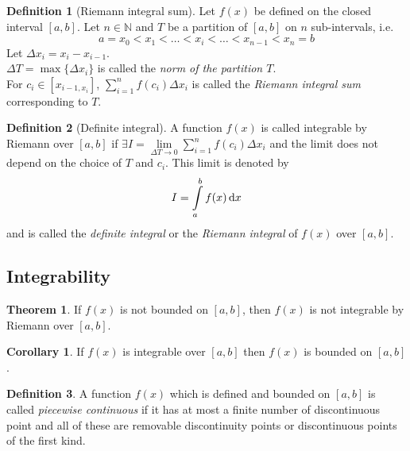 \documentclass[fleqn, a4paper, 12pt]{article}
\theoremstyle{definition}
\newtheorem{definition}{Definition}
\theoremstyle{theorem}
\newtheorem{theorem}{Theorem}
\newtheorem{corollary}{Corollary}
\theoremstyle{remark}
\begin{document}
\begin{definition}[Riemann integral sum]
	Let $f(x)$ be defined on the closed interval $[a, b]$. Let $n \in \mathbb{N}$ and $T$ be a partition of $[a, b]$ on $n$ sub-intervals, i.e.
	\begin{equation*}
		a = x_0 < x_1 < \dots < x_i < \dots < x_{n-1} < x_n = b
	\end{equation*}
	Let $\Delta x_i = x_i - x_{i - 1}$.\\
	$\Delta T = \max\{\Delta x_i\}$ is called the \emph{norm of the partition $T$}.\\
	For $c_i \in [x_{i-1, x_i}]$, $\sum_{i = 1}^{n} f(c_i) \Delta x_i$ is called the \emph{Riemann integral sum} corresponding to $T$.
\end{definition}

\begin{definition}[Definite integral]
	A function $f(x)$ is called integrable by Riemann over $[a, b]$ if $\exists I = \lim\limits_{\Delta T \to 0} \sum_{i = 1}^{n} f(c_i) \Delta x_i$ and the limit does not depend on the choice of $T$ and $c_i$. This limit is denoted by 
	\begin{equation*}
		I = \int\limits_{a}^{b} f(x) \dif x
	\end{equation*}
	and is called the \emph{definite integral} or the \emph{Riemann integral} of $f(x)$ over $[a, b]$.
\end{definition}

\subsection{Integrability}

\begin{theorem}
	If $f(x)$ is not bounded on $[a, b]$, then $f(x)$ is not integrable by Riemann over $[a, b]$.
\end{theorem}

\begin{corollary}
	If $f(x)$ is integrable over $[a, b]$ then $f(x)$ is bounded on $[a, b]$.
\end{corollary}

\begin{definition}
	A function $f(x)$ which is defined and bounded on $[a, b]$ is called \emph{piecewise continuous} if it has at most a finite number of discontinuous point and all of these are removable discontinuity points or discontinuous points of the first kind.
\end{definition}
\end{document}
